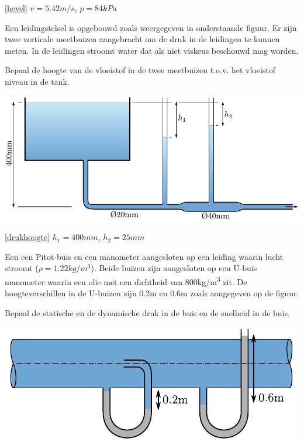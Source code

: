 \begin{antwoord}{\ref{hevel}}
	$v = 5.42\unit{m/s}$, $p = 84\unit{kPa}$
\end{antwoord}
\begin{toepassing}
	\label{drukhoogte}
Een leidingstelsel is opgebouwd zoals weergegeven in onderstaande figuur. Er zijn twee verticale meetbuizen aangebracht om de druk in de leidingen te kunnen meten. In de leidingen stroomt water dat als niet viskeus beschouwd mag worden.
		
Bepaal de hoogte van de vloeistof in de twee meetbuizen t.o.v. het vloeistof niveau in de tank.

	\centering
	\includegraphics{fig/behoudsvergelijkingen/drukhoogte}
\end{toepassing}
\begin{antwoord}{\ref{drukhoogte}}
	$h_1 = 400\unit{mm}$, $h_2 = 25\unit{mm}$
\end{antwoord}
\begin{toepassing}
	\label{dynamische_druk}
Een een Pitot-buis en een manometer aangesloten op een leiding waarin lucht stroomt ($\rho=1.22\unit{kg/m^3}$). Beide buizen zijn aangesloten op een U-buis manometer waarin een olie met een dichtheid van 800\unit{kg/m^3} zit. De hoogteverschillen in de U-buizen zijn 0.2m en 0.6m zoals aangegeven op de figuur.

Bepaal de statische en de dynamische druk in de buis en de snelheid in de buis.

	\centering
	\includegraphics{fig/behoudsvergelijkingen/dynamische_druk}
\end{toepassing}
